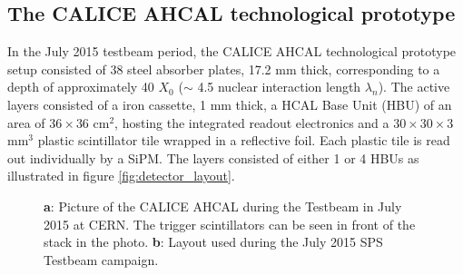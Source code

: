 \documentclass[twoside,a4paper,11pt]{article}
\begin{document}
\subsection{The CALICE AHCAL technological prototype}

In the July 2015 testbeam period, the CALICE AHCAL technological prototype setup consisted of 38 steel absorber plates, 17.2 mm thick, corresponding to a depth of approximately 40 $X_0$ ($\sim$ 4.5 nuclear interaction length $\lambda_{n}$). The active layers consisted of a iron cassette, 1 mm thick, a HCAL Base Unit (HBU) of an area of $36\times36$ cm$^2$, hosting the integrated readout electronics and a $30\times30\times3$ mm$^3$ plastic scintillator tile wrapped in a reflective foil. Each plastic tile is read out individually by a SiPM. The layers consisted of either 1 or 4 HBUs as illustrated in figure \ref{fig:detector_layout}. 

\begin{figure}[htbp]
	\hfill
	\caption[]{\textbf{a}: Picture of the CALICE AHCAL during the Testbeam in July 2015 at CERN. The trigger scintillators can be seen in front of the stack in the photo. \textbf{b}: Layout used during the July 2015 SPS Testbeam campaign.}
	\label{fig:full_detector_layout}
\end{figure}
\end{document}
